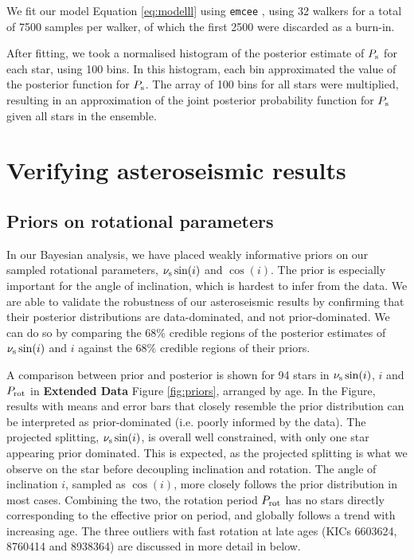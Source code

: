 We fit our model Equation \ref{eq:modelll} using \texttt{emcee} \cite{foreman-mackey+2013, foreman-mackey2016}, using 32 walkers for a total of 7500 samples per walker, of which the first 2500 were discarded as a burn-in.

After fitting, we took a normalised histogram of the posterior estimate of $P_{\rm s}$ for each star, using 100 bins. In this histogram, each bin approximated the value of the posterior function for $P_{\rm s}$. The array of 100 bins for all stars were multiplied, resulting in an approximation of the joint posterior probability function for $P_{\rm s}$ given all stars in the ensemble.

\section{Verifying asteroseismic results}
\subsection{Priors on rotational parameters}
In our Bayesian analysis, we have placed weakly informative priors on our sampled rotational parameters, $\nu_{\rm s}\sin(i)$ and $\cos(i)$. The prior is especially important for the angle of inclination, which is hardest to infer from the data. We are able to validate the robustness of our asteroseismic results by confirming that their posterior distributions are data-dominated, and not prior-dominated. We can do so by comparing the $68\%$ credible regions of the posterior estimates of $\nu_{\rm s}\sin(i)$ and $i$ against the $68\%$ credible regions of their priors.

A comparison between prior and posterior is shown for 94 stars in $\nu_{\rm s}\sin(i)$, $i$ and $P_{\rm rot}$ in \textbf{Extended Data} Figure \ref{fig:priors}, arranged by age. In the Figure, results with means and error bars that closely resemble the prior distribution can be interpreted as prior-dominated (i.e. poorly informed by the data). The projected splitting, $\nu_{\rm s}\sin(i)$, is overall well constrained, with only one star appearing prior dominated. This is expected, as the projected splitting is what we observe on the star before decoupling inclination and rotation. The angle of inclination $i$, sampled as $\cos(i)$, more closely follows the prior distribution in most cases. Combining the two, the rotation period $P_{\rm rot}$ has no stars directly corresponding to the effective prior on period, and globally follows a trend with increasing age. The three outliers with fast rotation at late ages (KICs 6603624, 8760414 and 8938364) are discussed in more detail in below.


